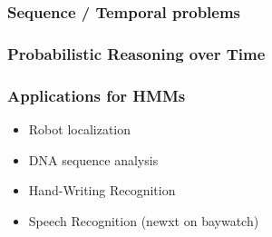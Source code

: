 
\begin{frame}
  \frametitle{Sequence / Temporal problems}
  
\end{frame}


\begin{frame}
  \frametitle{Probabilistic Reasoning over Time}
  
  
\end{frame}


\begin{frame}
  \frametitle{Applications for HMMs}
  \begin{itemize}[<+->]
  \item Robot localization
  \item DNA sequence analysis
  \item Hand-Writing Recognition
  \item Speech Recognition (newxt on baywatch)
  \end{itemize}
\end{frame}
